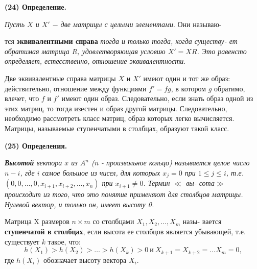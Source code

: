 \documentclass{mai_book}
\begin{document}
	\noindent
	{\bf (24) Определение.}
	
	{\it Пусть $X$ и $X'$ $-$ две матрицы с целыми элементами}. Они называю-\linebreak

	\pagebreak
	
	
	\noindent
	тся {\bf эквивалентными справа} {\it тогда и только тогда, когда существу-\linebreak
	ет обратимая матрица $R$, удовлетворяющая условию $X' = XR$. Это\linebreak
	равенсто определяет, естесственно, отношение эквивалентности}.\linebreak

	Две эквивалентные справа матрицы $X$ и $X'$ имеют один и тот же\linebreak
	образ: действительно, отношение между функциями $f' = fg$, в котором\linebreak
	$g$ обратимо, влечет, что $f$ и $f'$ имеют один образ. Следовательно, если\linebreak
	знать образ одной из этих матриц, то тогда изестен и образ другой\linebreak
	матрицы. Следовательно, необходимо рассмотреть класс матриц, образ\linebreak
	которых легко вычисляется. Матрицы, называемые ступенчатыми в\linebreak
	столбцах, образуют такой класс.
	
	\noindent
	{\bf (25) Определения.}
	
	{\it {\bf Высотой} вектора $x$ из $A^{n}$ ($n$ - произвольное кольцо) называется\linebreak
	целое число $n - i$, где $i$ самое большое из чисел, для которых $x_{j} = 0$ при\linebreak
	$1 \leqslant j \leqslant i$, т.е. $(0, 0, \ldots, 0, x_{i + 1}, x_{i + 2}, \ldots, x_{n})$ при $x_{i + 1} \neq 0$. Термин {\it $\ll$ вы-\linebreak
	сота$\gg$} происходит из того, что это понятие применяют для столбцов\linebreak
	матрицы. Нулевой вектор, и только он, имеет высоту 0.
	
	Матрица X размеров $n \times m$ со столбцами $X_{1}, X_{2}, \ldots, X_{m}$ назы-\linebreak
	вается {\bf ступенчатой в столбцах}, если высота ее столбцов является\linebreak
	убывающей, т.е. существует $k$ такое, что:
	$$h(X_{1}) > h(X_{2}) > \ldots > h(X_{k}) > 0 \ \text{и} \ X_{k + 1} = X_{k + 2} = \ldots X_{m} = 0,$$
	где $h(X_{i})$ обозначает высоту вектора $X_{i}$.}
	
\end{document}
